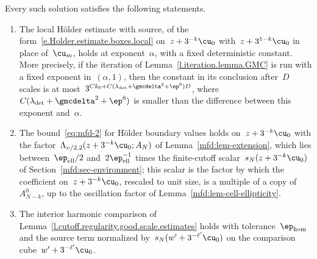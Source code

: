 \documentclass[11pt]{amsart}
\begin{document}
\begin{lemma}
\label{mfd:in-deterministic}
Every such solution satisfies the following statements.
\begin{enumerate}[label=(\roman*),leftmargin=*]
\item The local H\"older estimate with source, of the form~\eqref{e.Holder.estimate.boxes.local} on~$z+3^{-k}\cu_0$ with~$z+3^{1-k}\cu_0$ in place of~$\cu_m$, holds at exponent~$\alpha$, with a fixed deterministic constant. More precisely, if the iteration of Lemma~\ref{l.iteration.lemma.GMC} is run with a fixed exponent in~$(\alpha,1)$, then the constant in its conclusion after~$D$ scales is at most~$3^{Ck_0+C(\lambda_{\rm det}+\gmcdelta^2+\ep^8)D}$, where~$C(\lambda_{\rm det}+\gmcdelta^2+\ep^8)$ is smaller than the difference between this exponent and~$\alpha$.
\item The bound~\eqref{eq:mfd-2} for H\"older boundary values holds on~$z+3^{-k}\cu_0$ with the factor~$\Lambda_{\upsilon/2,2}(z+3^{-k}\cu_0;A_N)$ of Lemma~\ref{mfd:lem-extension}, which lies between~$\ep_{\rm ell}/2$ and~$2\ep_{\rm ell}^{-1}$ times the finite-cutoff scalar~$s_N(z+3^{-k}\cu_0)$ of Section~\ref{mfd:sec-environment}; this scalar is the factor by which the coefficient on~$z+3^{-k}\cu_0$, rescaled to unit size, is a multiple of a copy of~$A^0_{N-k}$, up to the oscillation factor of Lemma~\ref{mfd:lem-cell-ellipticity}.
\item The interior harmonic comparison of Lemma~\ref{l.cutoff.regularity.good.scale.estimates} holds with tolerance~$\ep_{\rm hom}$ and the source term normalized by~$s_N(w'+3^{-\ell'}\cu_0)$ on the comparison cube~$w'+3^{-\ell'}\cu_0$.
\end{enumerate}
\end{lemma}
\end{document}
